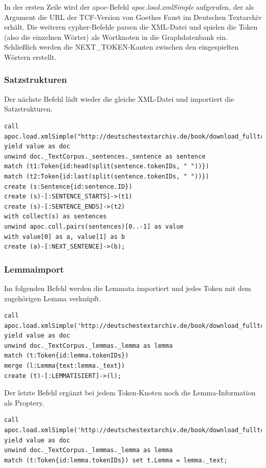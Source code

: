 \documentclass[12pt,ngerman,]{article}
\begin{document}
In der ersten Zeile wird der apoc-Befehl \emph{apoc.load.xmlSimple}
aufgerufen, der als Argument die URL der TCF-Version von Goethes Faust
im Deutschen Textarchiv erhält. Die weiteren cypher-Befehle parsen die
XML-Datei und spielen die Token (also die einzelnen Wörter) als
Wortknoten in die Graphdatenbank ein. Schließlich werden die
NEXT\_TOKEN-Kanten zwischen den eingespielten Wörtern erstellt.

\subsubsection{Satzstrukturen}\label{satzstrukturen}

Der nächste Befehl lädt wieder die gleiche XML-Datei und importiert die
Satzstrukturen.

\begin{verbatim}
call apoc.load.xmlSimple("http://deutschestextarchiv.de/book/download_fulltcf/16181") yield value as doc
unwind doc._TextCorpus._sentences._sentence as sentence
match (t1:Token{id:head(split(sentence.tokenIDs, " "))})
match (t2:Token{id:last(split(sentence.tokenIDs, " "))})
create (s:Sentence{id:sentence.ID})
create (s)-[:SENTENCE_STARTS]->(t1)
create (s)-[:SENTENCE_ENDS]->(t2)
with collect(s) as sentences
unwind apoc.coll.pairs(sentences)[0..-1] as value
with value[0] as a, value[1] as b
create (a)-[:NEXT_SENTENCE]->(b);
\end{verbatim}

\subsubsection{Lemmaimport}\label{lemmaimport}

Im folgenden Befehl werden die Lemmata importiert und jedes Token mit
dem zugehörigen Lemma verknüpft.

\begin{verbatim}
call apoc.load.xmlSimple('http://deutschestextarchiv.de/book/download_fulltcf/16181') yield value as doc
unwind doc._TextCorpus._lemmas._lemma as lemma
match (t:Token{id:lemma.tokenIDs})
merge (l:Lemma{text:lemma._text})
create (t)-[:LEMMATISIERT]->(l);
\end{verbatim}

Der letzte Befehl ergänzt bei jedem Token-Knoten noch die
Lemma-Information als Proptery.

\begin{verbatim}
call apoc.load.xmlSimple('http://deutschestextarchiv.de/book/download_fulltcf/16181') yield value as doc
unwind doc._TextCorpus._lemmas._lemma as lemma
match (t:Token{id:lemma.tokenIDs}) set t.Lemma = lemma._text;
\end{verbatim}
\end{document}
